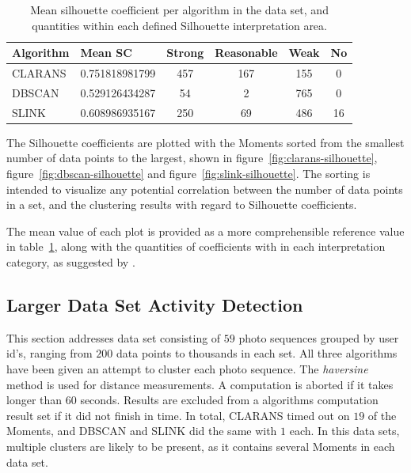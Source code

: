 \begin{table}
    \centering
    {\begin{tabular}{ | l | l | c c c c | }
        \hline
        Algorithm & Mean SC        & Strong & Reasonable & Weak & No  \\
        \hline
        CLARANS   & 0.751818981799 & 457    & 167        & 155  & 0  \\
        DBSCAN    & 0.529126434287 & 54     & 2          & 765  & 0  \\
        SLINK     & 0.608986935167 & 250    & 69         & 486  & 16 \\
        \hline
    \end{tabular}}
    \caption{Mean silhouette coefficient per algorithm in the data set, and
        quantities within each defined Silhouette interpretation area.} 
    \label{table:mean-silhouette}
\end{table}

The Silhouette coefficients are plotted with the Moments sorted from 
the smallest number of data points to the largest, shown in 
figure~\ref{fig:clarans-silhouette}, figure~\ref{fig:dbscan-silhouette}
and figure~\ref{fig:slink-silhouette}. The sorting is intended
to visualize any potential correlation between the number of data points 
in a set, and the clustering results with regard to Silhouette coefficients.

The mean value of each plot is provided as a more comprehensible reference 
value in table~\ref{table:mean-silhouette}, along with the quantities of
coefficients with in each interpretation category, 
as suggested by \citeauthor{silhouettes}.

\cleartoleftpage

\subsection{Larger Data Set Activity Detection}
This section addresses data set consisting of $59$ photo sequences
grouped by user id's, ranging 
from $200$ data points to thousands in each set. All three algorithms
have been given an attempt to cluster each photo sequence. The \emph{haversine} 
method is used for distance measurements. A computation is aborted if 
it takes longer than $60$ seconds. Results are 
excluded from a algorithms computation result set if it did not finish
in time. In total, CLARANS timed out on $19$ of the Moments, and 
DBSCAN and SLINK did the same with $1$ each. In this data sets, multiple
clusters are likely to be present, as it contains several Moments in 
each data set. 

